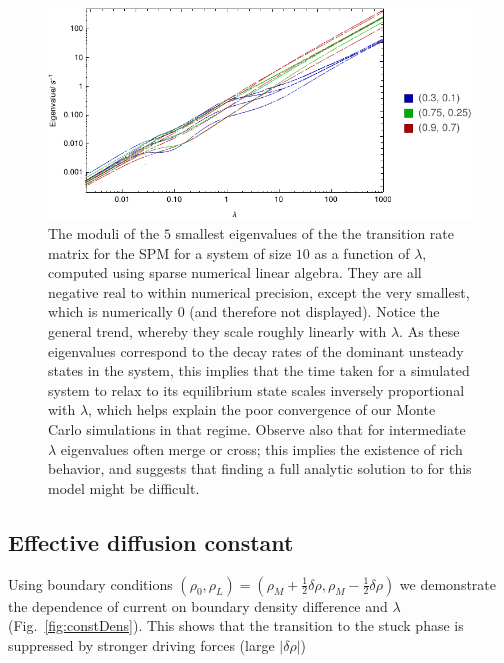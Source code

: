 \documentclass[
reprint, amsmath,amssymb,
]{revtex4-1}
\begin{document}
\begin{figure}[h!]
\vspace{0em}
\begin{center}
    \includegraphics[width=1\linewidth]{eigenspectrumGoodRange}
\end{center}
    \vspace{-0em}
\caption{\label{fig:eigenspec} The moduli of the $5$ smallest eigenvalues of the the transition rate matrix for the SPM for a system of size $10$ as a function of $\lambda$, computed using sparse numerical linear algebra.
They are all negative real to within numerical precision,
except the very smallest, which is numerically $0$ (and therefore not displayed). Notice the general trend, whereby they scale roughly linearly with $\lambda$. As these eigenvalues correspond to the decay rates
of the dominant unsteady states in the system, this implies that the time taken for a simulated system to relax
to its equilibrium state scales inversely proportional with $\lambda$, which helps explain the poor convergence of our Monte Carlo simulations in that regime.
Observe also that for intermediate $\lambda$ eigenvalues often merge or cross; this implies the existence of rich behavior, and suggests that finding a  full analytic solution to for this model might be difficult.}
\end{figure}

\subsection{Effective diffusion constant}


Using boundary conditions $(\rho_0, \rho_L) = (\rho_M + \frac{1}{2}
\delta\rho, \rho_M - \frac{1}{2} \delta\rho)$ we demonstrate the
dependence of current on boundary density difference and $\lambda$ (Fig.~\ref{fig:constDens}).  This
shows that the transition to the stuck phase is suppressed by stronger
driving forces (large $|\delta\rho|$)
\end{document}
